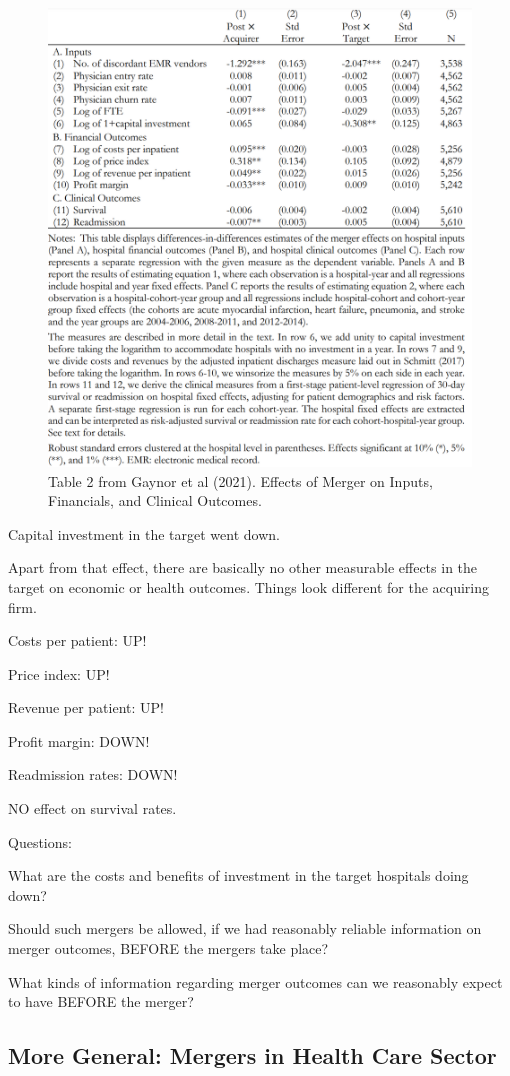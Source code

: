 \documentclass[
]{book}
\begin{document}
\begin{figure}

{\centering \includegraphics[width=0.7\linewidth]{img/oligopoly/papertable3} 

}

\caption{Table 2 from Gaynor et al (2021). Effects of Merger on Inputs, Financials, and Clinical Outcomes.}\label{fig:oligopolypapertable3}
\end{figure}

Capital investment in the target went down.

Apart from that effect, there are basically no other measurable effects in the target on economic or health outcomes. Things look different for the acquiring firm.

Costs per patient: UP!

Price index: UP!

Revenue per patient: UP!

Profit margin: DOWN!

Readmission rates: DOWN!

NO effect on survival rates.

Questions:

What are the costs and benefits of investment in the target hospitals doing down?

Should such mergers be allowed, if we had reasonably reliable information on merger outcomes, BEFORE the mergers take place?

What kinds of information regarding merger outcomes can we reasonably expect to have BEFORE the merger?

\hypertarget{more-general-mergers-in-health-care-sector}{%
\subsection{More General: Mergers in Health Care Sector}\label{more-general-mergers-in-health-care-sector}}
\end{document}

